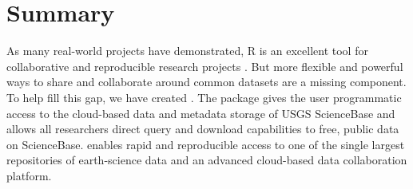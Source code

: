 \section{Summary}

As many real-world projects have demonstrated, R is
an excellent tool for collaborative and reproducible
research projects \citep{Gandrud2013}. But more flexible and powerful
ways to share and collaborate around common datasets
are a missing component. To help fill this gap, we
have created . The  package
gives the user programmatic access to the
cloud-based data and metadata storage of USGS ScienceBase
and allows all researchers direct query and download
capabilities to free, public data on ScienceBase.
 enables rapid and reproducible
access to one of the single
largest repositories of earth-science data and an advanced
cloud-based data collaboration platform.
